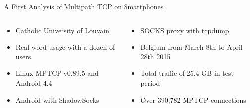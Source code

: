 \documentclass{beamer}
\begin{document}
\begin{frame}{A First Analysis of Multipath TCP on Smartphones}
  \begin{columns}

    \begin{column}{0.48\textwidth}
      \begin{itemize}
        \setlength\itemsep{0.8em}
        \item Catholic University of Louvain
        \item Real word usage with a dozen of users
        \item Linux MPTCP v0.89.5 and Android 4.4
        \item Android with ShadowSocks
      \end{itemize}
    \end{column}


    \begin{column}{0.48\textwidth}
      \begin{itemize}
        \setlength\itemsep{0.8em}
        \item SOCKS proxy with tcpdump
        \item Belgium from March 8th to April 28th 2015
        \item Total traffic of 25.4 GB in test period
        \item Over 390,782 MPTCP connections
      \end{itemize}
    \end{column}
  \end{columns}
  \vfill
\end{frame}
\end{document}
